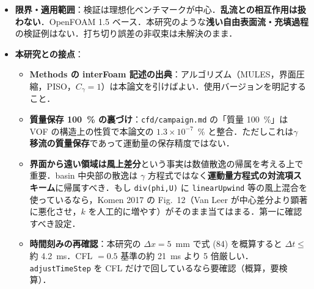 \documentclass[11pt]{jsarticle}
\begin{document}
\begin{itemize}
\begin{itemize}
    \item \textbf{定在重力波（§3.2.1）が本研究に最も近い検証}：$H = L = 1$~m，密度比 1000，閉じた容器，slip 壁．$\lambda/\Delta x = 50$ という粗さでも解析解（Lamb）と周波数がよく一致．ただし Fig.~8 では 8 周期ほどで位相ずれが見え始める＝\textbf{長時間計算では位相誤差が蓄積する}．大半のケースを $\sigma = 0$ で実施．
    \item 曲率は格子を細かくしても 10~\% ずれたまま収束する（$\Delta P_\mathrm{exact} = 4$ に対し 3.6，§3.3.2）．
    \item \textbf{時間刻みの安定条件}：$\Delta t \leq \max(10\tau_\mu,\ 0.1\tau_\rho)$，$\tau_\mu = \mu\Delta x/\sigma$，$\tau_\rho = \sqrt{\rho\Delta x^3/\sigma}$（式 84）．$C_1 = 0.01$, $C_2 = 10$ は約 80 本の計算から決めた interFoam 固有の値．これは\textbf{表面張力の陽的処理に対する数値安定条件}であって，表面張力が物理的に効くかとは無関係．$\sigma \neq 0$ なら We が大きくても適用される．ただし著者は「移動界面では spurious current の生成は二次的なので保守的な見積もり」と留保．
  \end{itemize}
  \item \textbf{限界・適用範囲}：検証は理想化ベンチマークが中心．\textbf{乱流との相互作用は扱わない}．OpenFOAM 1.5 ベース．本研究のような\textbf{浅い自由表面流・充填過程}の検証例はない．打ち切り誤差の非収束は未解決のまま．
  \item \textbf{本研究との接点}：
  \begin{itemize}
    \item \textbf{Methods の interFoam 記述の出典}：アルゴリズム（MULES，界面圧縮，PISO，$C_\gamma = 1$）は本論文を引けばよい．使用バージョンを明記すること．
    \item \textbf{質量保存 100~\% の裏づけ}：\texttt{cfd/campaign.md} の「質量 100~\%」は VOF の構造上の性質で本論文の $1.3\times10^{-7}$~\% と整合．ただしこれは\textbf{$\gamma$ 移流の質量保存}であって運動量の保存精度ではない．
    \item \textbf{界面から遠い領域は風上差分}という事実は数値散逸の帰属を考える上で重要．basin 中央部の散逸は $\gamma$ 方程式ではなく\textbf{運動量方程式の対流項スキーム}に帰属すべき．もし \texttt{div(phi,U)} に \texttt{linearUpwind} 等の風上混合を使っているなら，Komen 2017 の Fig.~12（Van Leer が中心差分より顕著に悪化させ，$k$ を人工的に増やす）がそのまま当てはまる．第一に確認すべき設定．
    \item \textbf{時間刻みの再確認}：本研究の $\Delta x = 5$~mm で式 (84) を概算すると $\Delta t \leq$ 約 4.2~ms．CFL $=0.5$ 基準の約 21~ms より 5 倍厳しい．\texttt{adjustTimeStep} を CFL だけで回しているなら要確認（概算，要検算）．

\end{itemize}
\end{itemize}
\end{document}
